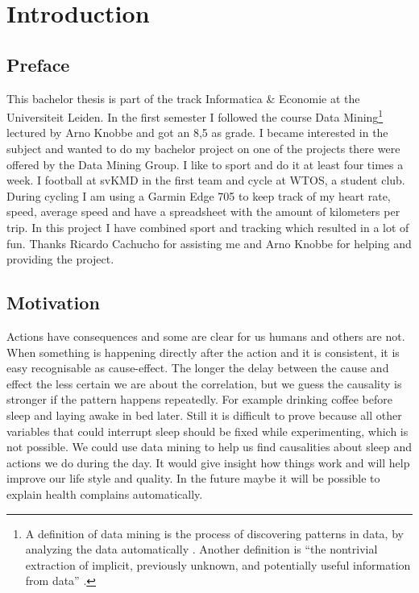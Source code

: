\section{Introduction}
	\subsection{Preface}
		This bachelor thesis is part of the track Informatica \& Economie at the Universiteit Leiden. In the first semester I followed the course Data Mining\footnote{A definition of data mining is the process of discovering patterns in data, by analyzing the data automatically \cite{datamining}. Another definition is ``the nontrivial extraction of implicit, previously unknown, and potentially useful information from data'' \cite{frawley}.} lectured by Arno Knobbe and got an 8,5 as grade. I became interested in the subject and wanted to do my bachelor project on one of the projects there were offered by the Data Mining Group. I like to sport and do it at least four times a week. I football at svKMD in the first team and cycle at WTOS, a student club. During cycling I am using a Garmin Edge 705 to keep track of my heart rate, speed, average speed and have a spreadsheet with the amount of kilometers per trip. In this project I have combined sport and tracking which resulted in a lot of fun. Thanks Ricardo Cachucho for assisting me and Arno Knobbe for helping and providing the project.

	\subsection{Motivation}
		\label{seq:motivation}
		Actions have consequences and some are clear for us humans and others are not. When something is happening directly after the action and it is consistent, it is easy recognisable as cause-effect. The longer the delay between the cause and effect the less certain we are about the correlation, but we guess the causality is stronger if the pattern happens repeatedly. For example drinking coffee before sleep and laying awake in bed later. Still it is difficult to prove because all other variables that could interrupt sleep should be fixed while experimenting, which is not possible. We could use data mining to help us find causalities about sleep and actions we do during the day. It would give insight how things work and will help improve our life style and quality. In the future maybe it will be possible to explain health complains automatically.

